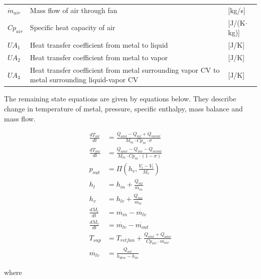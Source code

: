 \begin{center}
\begin{tabular}{l p{10cm} l}
		$\dot{m}_{air}$ & Mass flow of air through fan                                                                   & [\si{kg}/\si{s}]         \\
		$Cp_{air}$      & Specific heat capacity of air                                                                  & [\si{J}/(\si{K}$ \cdot $\si{kg})] \\
		$UA_1$          & Heat transfer coefficient from metal to liquid                                                 & [\si{J}/\si{K}]          \\
		$UA_2$          & Heat transfer coefficient from metal to vapor                                                  & [\si{J}/\si{K}]          \\
		$UA_3$          & Heat transfer coefficient from metal surrounding vapor CV to metal surrounding liquid-vapor CV & [\si{J}/\si{K}]
	\end{tabular}
\end{center}


The remaining state equations are given by equations below. They describe change in temperature of metal, pressure, specific enthalpy, mass balance and mass flow.

\begin{align}
	\frac{dT_{ml}}{dt} & = \frac{Q_{aml}-Q_{ml} + Q_{mvml}}{M_m \cdot Cp_m \cdot \sigma}        \\
	\frac{dT_{mv}}{dt} & = \frac{Q_{amv} - Q_{mv} - Q_{mvml}}{M_m \cdot Cp_m \cdot (1- \sigma)} \\
	p_{out}            & = \Pi \left( h_v, \frac{V_i-V_l}{M_v} \right)                          \\
	h_l                & = h_{in} + \frac{Q_{ml}}{\dot{m_{in}}}                                 \\
	h_v                & = h_{lv} + \frac{Q_{mv}}{\dot{m_{lv}}}                                 \\
	\frac{dM_l}{dt}    & = \dot{m_{in}} - \dot{m_{lv}}                                          \\
	\frac{dM_v}{dt}    & = \dot{m_{lv}} - \dot{m_{out}}                                         \\
	T_{sup}            & = T_{retfan} +  \frac{Q_{aml} + Q_{amv}}{Cp_{air} \cdot \dot{m_{air}}} \\
	\dot{m_{lv}}       & = \frac{Q_{ml}}{h_{dew} - h_{in}}
\end{align}

where\\


